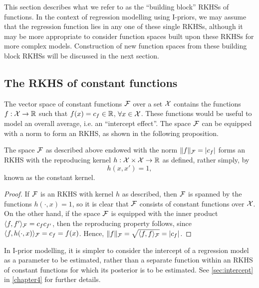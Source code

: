 This section describes what we refer to as the ``building block'' RKHSs of functions.
In the context of regression modelling using I-priors, we may assume that the regression function lies in any one of these single RKHSs, although it may be more appropriate to consider function spaces built upon these RKHSs for more complex models.
Construction of new function spaces from these building block RKHSs will be discussed in the next section.

\subsection{The RKHS of constant functions}

The vector space of constant functions ${\mathcal F}$ over a set ${\mathcal X}$ contains the functions $f:{\mathcal X} \to \mathbb{R}$ such that $f(x) = c_f \in \mathbb{R}$, $\forall x \in {\mathcal X}$.
These functions would be useful to model an overall average, i.e. an ``intercept effect''.
The space ${\mathcal F}$ can be equipped with a norm to form an RKHS, as shown in the following proposition.

\begin{proposition}
  The space ${\mathcal F}$ as described above endowed with the norm $\lVert f\rVert_{\mathcal F} = \vert c_f \vert$ forms an RKHS with the reproducing kernel $h:{\mathcal X}\times{\mathcal X}\to\mathbb{R}$ as defined, rather simply, by
  \[
    h(x,x') = 1,
  \]
  known as the constant kernel.
\end{proposition}

\begin{proof}
  If ${\mathcal F}$ is an RKHS with kernel $h$ as described, then ${\mathcal F}$ is spanned by the  functions $h(\cdot,x) = 1$, so it is clear that ${\mathcal F}$ consists of constant functions over ${\mathcal X}$.
  On the other hand, if the space ${\mathcal F}$ is equipped with the inner product $\langle f,f'\rangle_{\mathcal F} = c_f c_{f'}$, then the reproducing property follows, since $\langle f,h(\cdot,x)\rangle_{\mathcal F} = c_f = f(x)$.
  Hence, $\lVert f\rVert_{\mathcal F} = \sqrt{\langle f,f\rangle_{\mathcal F}} = \vert c_f \vert$.
\end{proof}

\begin{remark}
  In I-prior modelling, it is simpler to consider the intercept of a regression model as a parameter to be estimated, rather than a separate function within an RKHS of constant functions for which its posterior is to be estimated.
  See \cref{sec:intercept}  in \cref{chapter4} for further details.  
\end{remark}

